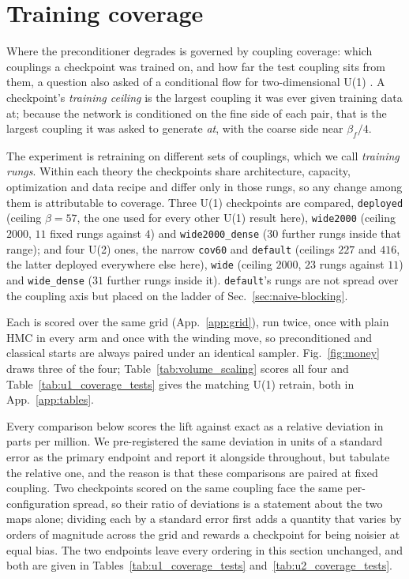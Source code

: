 \documentclass[prd, twocolumn, superscriptaddress, nofootinbib,floatfix]{revtex4-2}
\DeclareRobustCommand{\fig}[1]{Fig.~\ref{fig:#1}}
\DeclareRobustCommand{\app}[1]{App.~\ref{app:#1}}
\DeclareRobustCommand{\sect}[1]{Sec.~\ref{sec:#1}}
\DeclareRobustCommand{\tb}[1]{Table~\ref{tab:#1}}
\DeclareRobustCommand{\tbs}[2]{Tables~\ref{tab:#1} and~\ref{tab:#2}}
\begin{document}
\section{Training coverage}
\label{sec:coverage}

Where the preconditioner degrades is governed by coupling coverage: which
couplings a checkpoint was trained on, and how far the test coupling sits from
them, a question also asked of a conditional flow for two-dimensional U(1)
\cite{singha2023conditional}. A checkpoint's \emph{training
ceiling} is the largest coupling it was ever given training data at; because the
network is conditioned on the fine side of each pair, that is the largest
coupling it was asked to generate \emph{at}, with the coarse side near
$\beta_f/4$.

The experiment is retraining on different sets of couplings, which we call
\emph{training rungs}. Within each theory the checkpoints share architecture,
capacity, optimization and data recipe and differ only in those rungs, so any
change among them is attributable to coverage. Three U(1) checkpoints are
compared, \texttt{deployed} (ceiling $\beta=57$, the one used for every other
U(1) result here), \texttt{wide2000} (ceiling $2000$, $11$ fixed rungs against
$4$) and \texttt{wide2000\_dense} ($30$ further rungs inside that range); and
four U(2) ones, the narrow \texttt{cov60} and \texttt{default} (ceilings $227$
and $416$, the latter deployed everywhere else here), \texttt{wide} (ceiling
$2000$, $23$ rungs against $11$) and \texttt{wide\_dense} ($31$ further rungs
inside it). \texttt{default}'s rungs are not spread over the coupling axis but
placed on the ladder of \sect{naive-blocking}.

Each is scored over the same grid (\app{grid}), run twice, once with plain HMC
in every arm and once with the winding move, so preconditioned and classical
starts are always paired under an identical sampler. \fig{money} draws three of
the four; \tb{volume_scaling} scores all four and
\tb{u1_coverage_tests} gives the matching U(1) retrain, both in \app{tables}.

Every comparison below scores the lift against exact as a relative deviation in
parts per million. We pre-registered the same deviation in units of a standard
error as the primary endpoint and report it alongside throughout, but tabulate
the relative one, and the reason is that these comparisons are paired at fixed
coupling. Two checkpoints scored on the same coupling face the same
per-configuration spread, so their ratio of deviations is a statement about the
two maps alone; dividing each by a standard error first adds a quantity that
varies by orders of magnitude across the grid and rewards a checkpoint for being
noisier at equal bias. The two endpoints leave every ordering in this section
unchanged, and both are given in \tbs{u1_coverage_tests}{u2_coverage_tests}.
\end{document}
